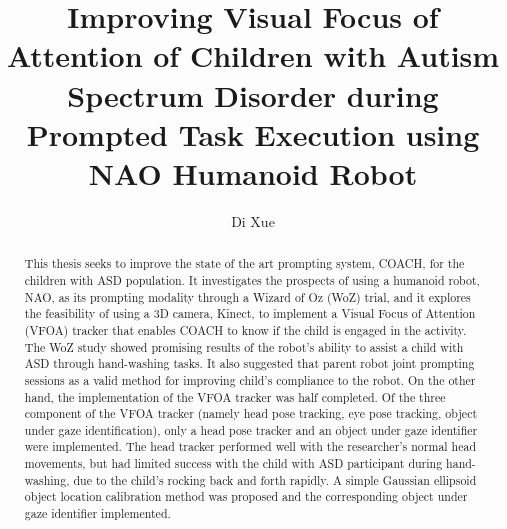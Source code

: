 \documentclass{ut-thesis}
\author{Di Xue}
\title{Improving Visual Focus of Attention of Children with Autism Spectrum Disorder during Prompted Task Execution using NAO Humanoid Robot}
\begin{document}
\begin{preliminary}

\maketitle


\begin{abstract}
This thesis seeks to improve the state of the art prompting system, COACH, for the children with ASD population.  It investigates the prospects of using a humanoid robot, NAO, as its prompting modality through a Wizard of Oz (WoZ) trial, and it explores the feasibility of using a 3D camera, Kinect, to implement a Visual Focus of Attention (VFOA) tracker that enables COACH to know if the child is engaged in the activity.  The WoZ study showed promising results of the robot's ability to assist a child with ASD through hand-washing tasks.  It also suggested that parent robot joint prompting sessions as a valid method for improving child's compliance to the robot.  On the other hand, the implementation of the VFOA tracker was half completed.  Of the three component of the VFOA tracker (namely head pose tracking, eye pose tracking, object under gaze identification), only a head pose tracker and an object under gaze identifier were implemented.  The head tracker performed well with the researcher's normal head movements, but had limited success with the child with ASD participant during hand-washing, due to the child's rocking back and forth rapidly.  A simple Gaussian ellipsoid object location calibration method was proposed and the corresponding object under gaze identifier implemented.
\end{abstract}



\end{preliminary}
\end{document}
